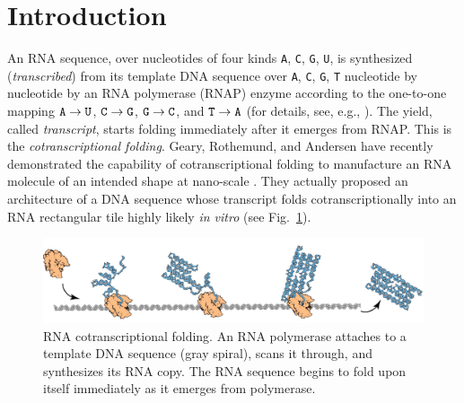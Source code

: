 	\section{Introduction}

An RNA sequence, over nucleotides of four kinds {\tt A}, {\tt C}, {\tt G}, {\tt U}, is synthesized (\textit{transcribed}) from its template DNA sequence over {\tt A}, {\tt C}, {\tt G}, {\tt T} nucleotide by nucleotide by an RNA polymerase (RNAP) enzyme according to the one-to-one mapping ${\tt A} \to {\tt U}$, ${\tt C} \to {\tt G}$, ${\tt G} \to {\tt C}$, and ${\tt T} \to {\tt A}$ (for details, see, e.g., \cite{AJLMRRW2014}). 
The yield, called \textit{transcript}, starts folding immediately after it emerges from RNAP. 
This is the \textit{cotranscriptional folding}. 
Geary, Rothemund, and Andersen have recently demonstrated the capability of cotranscriptional folding to manufacture an RNA molecule of an intended shape at nano-scale \cite{GearyRothemundAndersen2014}. 
They actually proposed an architecture of a DNA sequence whose transcript folds cotranscriptionally into an RNA rectangular tile highly likely \textit{in vitro} (see Fig.~\ref{fig:rna_origami}). 

\begin{figure}[htb]
\centering
\includegraphics[width=\linewidth]{pic/rna_origami.pdf}
\caption{RNA cotranscriptional folding. 
An RNA polymerase attaches to a template DNA sequence (gray spiral), scans it through, and synthesizes its RNA copy. 
The RNA sequence begins to fold upon itself immediately as it emerges from polymerase. 
}
\label{fig:rna_origami}
\end{figure}

